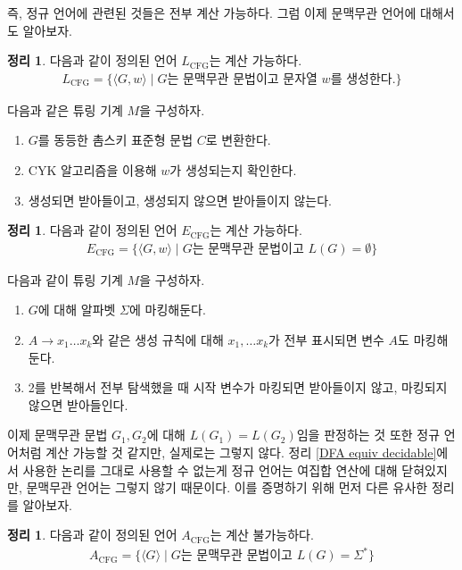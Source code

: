\documentclass[b5paper, 11pt]{book}
\theoremstyle{definition}
\newtheorem{thm}[defn]{정리}
\newenvironment{pf*}{\pushQED{\qed}\pf}
{\popQED\endpf}
\begin{document}
즉, 정규 언어에 관련된 것들은 전부 계산 가능하다. 그럼 이제 문맥무관 언어에 대해서도 알아보자.
\begin{thm}
    다음과 같이 정의된 언어 $L_{\text{CFG}}$는 계산 가능하다.
    \begin{align*}
        L_{\text{CFG}} = \{\langle G, w \rangle \;\vert\; 
        G\text{는 문맥무관 문법이고 문자열 } w\text{를 생성한다.}\}
    \end{align*}
\end{thm}
\begin{pf*}
    다음과 같은 튜링 기계 $M$을 구성하자.
    \begin{enumerate}
        \item $G$를 동등한 촘스키 표준형 문법 $C$로 변환한다.
        \item CYK 알고리즘을 이용해 $w$가 생성되는지 확인한다.
        \item 생성되면 받아들이고, 생성되지 않으면 받아들이지 않는다.
    \end{enumerate}
\end{pf*}
\begin{thm}
    다음과 같이 정의된 언어 $E_\text{CFG}$는 계산 가능하다.
    \begin{align*}
        E_{\text{CFG}} = \{\langle G, w \rangle \;\vert\;  G\text{는 문맥무관 문법이고 } L(G) = \emptyset\}
    \end{align*}
\end{thm}
\begin{pf*}
    다음과 같이 튜링 기계 $M$을 구성하자.
    \begin{enumerate}
        \item $G$에 대해 알파벳 $\Sigma$에 마킹해둔다. 
        \item $A \rightarrow x_1 \ldots x_k$와 같은 생성 규칙에 대해  $x_1, \ldots x_k$가 전부 표시되면 변수 $A$도 마킹해둔다.
        \item 2를 반복해서 전부 탐색했을 때 시작 변수가 마킹되면 받아들이지 않고,  마킹되지 않으면 받아들인다. 
    \end{enumerate}
\end{pf*}
이제 문맥무관 문법 $G_1, G_2$에 대해 $L(G_1) = L(G_2)$임을 판정하는 것 또한 정규 언어처럼 계산 가능할 것 같지만, 실제로는 그렇지 않다. 정리 \ref{DFA equiv decidable}에서 사용한 논리를 그대로 사용할 수 없는게 정규 언어는 여집합 연산에 대해 닫혀있지만, 문맥무관 언어는 그렇지 않기 때문이다. 이를 증명하기 위해 먼저 다른 유사한 정리를 알아보자.
\begin{thm}
    \label{all CFG undecidable}
    다음과 같이 정의된 언어 $A_\text{CFG}$는 계산 불가능하다.
    \begin{align*}
        A_\text{CFG} = \{\langle G \rangle \;\vert\; G\text{는 문맥무관 문법이고 } L(G) = \Sigma^*\}
    \end{align*}
\end{thm}
\end{document}
